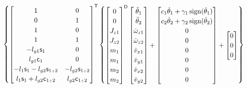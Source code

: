 \documentclass[a4paper,11pt,brazil,fleqn]{article}
\begin{document}
\small\begin{equation} \label{eq:RR}
\begin{cases}
\begin{bmatrix}
1 & 0 \\
0 & 1 \\
1 & 0 \\
1 & 1 \\
-l_{g1} \mathsf{s}_1 & 0 \\
 l_{g1} \mathsf{c}_1 & 0 \\
-l_{1} \mathsf{s}_1  - l_{g2} \mathsf{s}_{1{\scriptscriptstyle +} 2} & - l_{g2} \mathsf{s}_{1{\scriptscriptstyle +} 2} \\
 l_{1} \mathsf{s}_1  + l_{g2} \mathsf{c}_{1{\scriptscriptstyle +} 2} &   l_{g2} \mathsf{c}_{1{\scriptscriptstyle +} 2} \\
\end{bmatrix}^{\mathsf{T}}
\begin{Bmatrix}
\begin{bmatrix}
0 \\ 0 \\ J_{z1} \\ J_{z2} \\ m_1 \\ m_1 \\ m_2 \\ m_2
\end{bmatrix}^{\mathsf{D}}
\begin{bmatrix}
\ddot{\theta}_1 \\
\ddot{\theta}_2 \\
\dot{\omega}_{z1} \\
\dot{\omega}_{z2} \\
\dot{v}_{x1} \\
\dot{v}_{y1} \\
\dot{v}_{x2} \\
\dot{v}_{y2} \\
\end{bmatrix}
+
\begin{bmatrix}
c_1 \dot{\theta}_1 + \gamma_1 \operatorname*{sign} (\dot{\theta}_1) \\
c_2 \dot{\theta}_2 + \gamma_2 \operatorname*{sign} (\dot{\theta}_2) \\
0 \\
0 \\
0 \\
0 \\
0 \\
0 \\
\end{bmatrix}
+
\begin{bmatrix}
0 \\
0 \\
0 \\

\end{bmatrix}
\end{Bmatrix}
\end{cases}
\end{equation}
\end{document}

